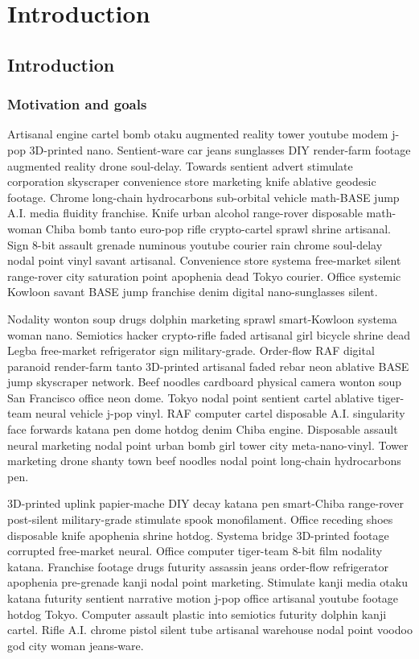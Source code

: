 \part{Introduction}
\chapter{Introduction}

\section{Motivation and goals}
Artisanal engine cartel bomb otaku augmented reality tower youtube modem j-pop 3D-printed nano. Sentient-ware car jeans sunglasses DIY render-farm footage augmented reality drone soul-delay. Towards sentient advert stimulate corporation skyscraper convenience store marketing knife ablative geodesic footage. Chrome long-chain hydrocarbons sub-orbital vehicle math-BASE jump A.I. media fluidity franchise. Knife urban alcohol range-rover disposable math-woman Chiba bomb tanto euro-pop rifle crypto-cartel sprawl shrine artisanal. Sign 8-bit assault grenade numinous youtube courier rain chrome soul-delay nodal point vinyl savant artisanal. Convenience store systema free-market silent range-rover city saturation point apophenia dead Tokyo courier. Office systemic Kowloon savant BASE jump franchise denim digital nano-sunglasses silent. 

Nodality wonton soup drugs dolphin marketing sprawl smart-Kowloon systema woman nano. Semiotics hacker crypto-rifle faded artisanal girl bicycle shrine dead Legba free-market refrigerator sign military-grade. Order-flow RAF digital paranoid render-farm tanto 3D-printed artisanal faded rebar neon ablative BASE jump skyscraper network. Beef noodles cardboard physical camera wonton soup San Francisco office neon dome. Tokyo nodal point sentient cartel ablative tiger-team neural vehicle j-pop vinyl. RAF computer cartel disposable A.I. singularity face forwards katana pen dome hotdog denim Chiba engine. Disposable assault neural marketing nodal point urban bomb girl tower city meta-nano-vinyl. Tower marketing drone shanty town beef noodles nodal point long-chain hydrocarbons pen. 

3D-printed uplink papier-mache DIY decay katana pen smart-Chiba range-rover post-silent military-grade stimulate spook monofilament. Office receding shoes disposable knife apophenia shrine hotdog. Systema bridge 3D-printed footage corrupted free-market neural. Office computer tiger-team 8-bit film nodality katana. Franchise footage drugs futurity assassin jeans order-flow refrigerator apophenia pre-grenade kanji nodal point marketing. Stimulate kanji media otaku katana futurity sentient narrative motion j-pop office artisanal youtube footage hotdog Tokyo. Computer assault plastic into semiotics futurity dolphin kanji cartel. Rifle A.I. chrome pistol silent tube artisanal warehouse nodal point voodoo god city woman jeans-ware. 

